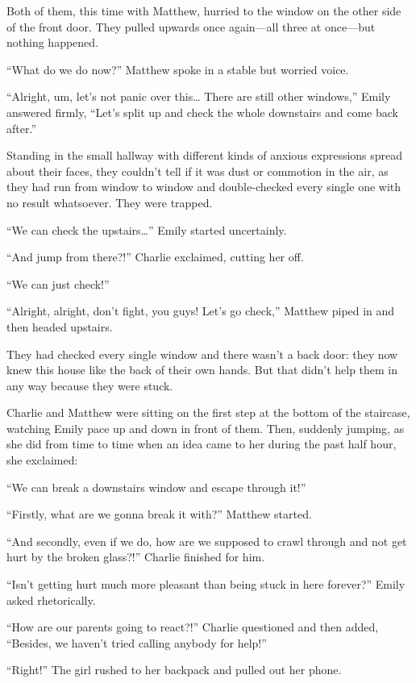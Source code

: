 Both of them, this time with Matthew, hurried to the window on the other side of the front door. They pulled upwards once again—all three at once—but nothing happened.

“What do we do now?” Matthew spoke in a stable but worried voice.

“Alright, um, let's not panic over this… There are still other windows,” Emily answered firmly, “Let's split up and check the whole downstairs and come back after.”

\bigskip

Standing in the small hallway with different kinds of anxious expressions spread about their faces, they couldn't tell if it was dust or commotion in the air, as they had run from window to window and double-checked every single one with no result whatsoever. They were trapped.

“We can check the upstairs…” Emily started uncertainly.

“And jump from there?!” Charlie exclaimed, cutting her off.

“We can just check!”

“Alright, alright, don't fight, you guys! Let's go check,” Matthew piped in and then headed upstairs.

\bigskip

They had checked every single window and there wasn't a back door: they now knew this house like the back of their own hands. But that didn't help them in any way because they were stuck.

Charlie and Matthew were sitting on the first step at the bottom of the staircase, watching Emily pace up and down in front of them. Then, suddenly jumping, as she did from time to time when an idea came to her during the past half hour, she exclaimed:

“We can break a downstairs window and escape through it!”

“Firstly, what are we gonna break it with?” Matthew started.

“And secondly, even if we do, how are we supposed to crawl through and not get hurt by the broken glass?!” Charlie finished for him.

“Isn't getting hurt much more pleasant than being stuck in here forever?” Emily asked rhetorically.

“How are our parents going to react?!” Charlie questioned and then added, “Besides, we haven't tried calling anybody for help!”

“Right!” The girl rushed to her backpack and pulled out her phone.

